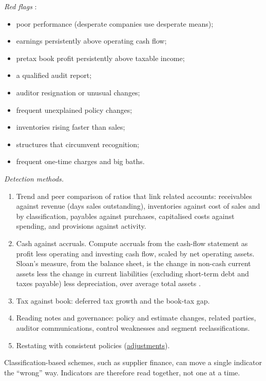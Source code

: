 \begin{qfmethod}\label{meth:reporting-warning-signs}
 \emph{Red flags} \citep[p.~113]{financial-statement-analysis-2009}:
\begin{itemize}
\item poor performance (desperate companies use desperate means);
\item earnings persistently above operating cash flow;
\item pretax book profit persistently above taxable income;
\item a qualified audit report;
\item auditor resignation or unusual changes;
\item frequent unexplained policy changes;
\item inventories rising faster than sales;
\item structures that circumvent recognition;
\item frequent one-time charges and big baths.
\end{itemize}

\emph{Detection methods.}
\begin{enumerate}
\item Trend and peer comparison of ratios that link related accounts: receivables against revenue (days sales outstanding), inventories against cost of sales and by classification, payables against purchases, capitalised costs against spending, and provisions against activity.
\item Cash against accruals. Compute accruals from the cash-flow statement as profit less operating and investing cash flow, scaled by net operating assets. Sloan's measure, from the balance sheet, is the change in non-cash current assets less the change in current liabilities (excluding short-term debt and taxes payable) less depreciation, over average total assets \citep[pp.~293--294]{wide-sloan-accruals}.
\item Tax against book: deferred tax growth and the book-tax gap.
\item Reading notes and governance: policy and estimate changes, related parties, auditor communications, control weaknesses and segment reclassifications.
\item Restating with consistent policies (\hyperref[meth:accounting-analysis-adjustments]{adjustments}).
\end{enumerate}
Classification-based schemes, such as supplier finance, can move a single indicator the ``wrong'' way. Indicators are therefore read together, not one at a time.


\end{qfmethod}
